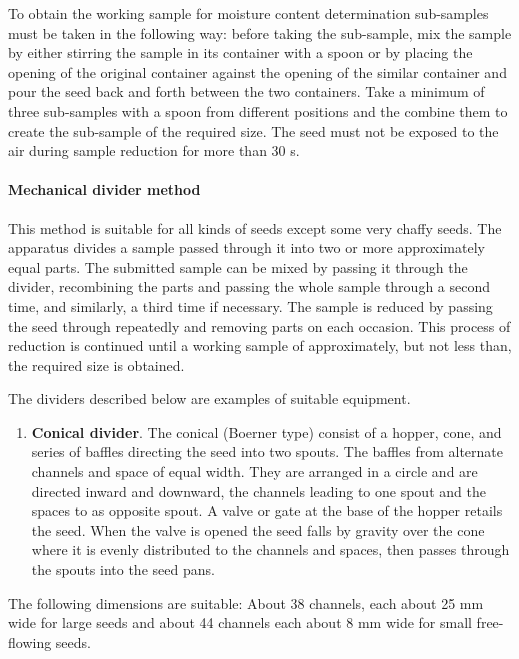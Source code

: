 \documentclass[
]{book}
\providecommand{\tightlist}{%
  \setlength{\itemsep}{0pt}\setlength{\parskip}{0pt}}
\begin{document}
To obtain the working sample for moisture content determination sub-samples must be taken in the following way: before taking the sub-sample, mix the sample by either stirring the sample in its container with a spoon or by placing the opening of the original container against the opening of the similar container and pour the seed back and forth between the two containers. Take a minimum of three sub-samples with a spoon from different positions and the combine them to create the sub-sample of the required size. The seed must not be exposed to the air during sample reduction for more than 30 s.

\hypertarget{mechanical-divider-method}{%
\paragraph{Mechanical divider method}\label{mechanical-divider-method}}

This method is suitable for all kinds of seeds except some very chaffy seeds. The apparatus divides a sample passed through it into two or more approximately equal parts. The submitted sample can be mixed by passing it through the divider, recombining the parts and passing the whole sample through a second time, and similarly, a third time if necessary. The sample is reduced by passing the seed through repeatedly and removing parts on each occasion. This process of reduction is continued until a working sample of approximately, but not less than, the required size is obtained.

The dividers described below are examples of suitable equipment.

\begin{enumerate}
\def\labelenumi{\alph{enumi}.}
\tightlist
\item
  \textbf{Conical divider}. The conical (Boerner type) consist of a hopper, cone, and series of baffles directing the seed into two spouts. The baffles from alternate channels and space of equal width. They are arranged in a circle and are directed inward and downward, the channels leading to one spout and the spaces to as opposite spout. A valve or gate at the base of the hopper retails the seed. When the valve is opened the seed falls by gravity over the cone where it is evenly distributed to the channels and spaces, then passes through the spouts into the seed pans.
\end{enumerate}

The following dimensions are suitable: About 38 channels, each about 25 mm wide for large seeds and about 44 channels each about 8 mm wide for small free- flowing seeds.
\end{document}
